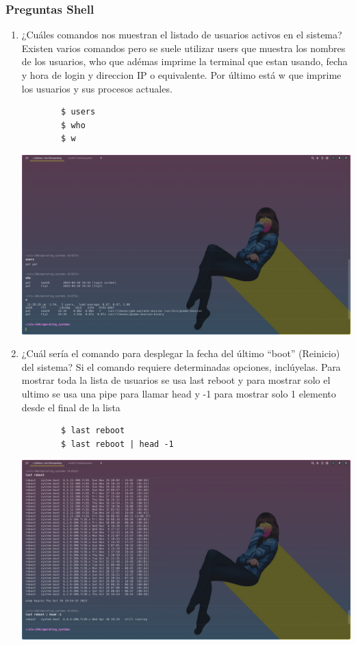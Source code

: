 \documentclass{article}
\begin{document}
\subsubsection{Preguntas Shell}
\begin{enumerate}
    \item ¿Cuáles comandos nos muestran el listado de usuarios activos en el sistema?
    Existen varios comandos pero se suele utilizar users que muestra los nombres de los usuarios, who que adémas imprime la terminal que estan usando, fecha y hora de login y direccion IP o equivalente. Por último está w que imprime los usuarios y sus procesos actuales. 
        \begin{verbatim}
        $ users
        $ who
        $ w
        \end{verbatim}
        \includegraphics[scale=0.25,trim={0 0 20cm 20cm},clip]{LinuxCapturas/users.png}
        
    \item ¿Cuál sería el comando para desplegar la fecha del último “boot” (Reinicio) del sistema? Si el comando requiere determinadas opciones, inclúyelas. Para mostrar toda la lista de usuarios se usa last reboot y para mostrar solo el ultimo se usa una pipe para llamar head y -1 para mostrar solo 1 elemento desde el final de la lista
    
        \begin{verbatim}
        $ last reboot
        $ last reboot | head -1
        \end{verbatim}
        \includegraphics[scale=0.25,trim={0 0 20cm 0},clip]{LinuxCapturas/last-boot.png}  
    

\end{enumerate}
\end{document}
